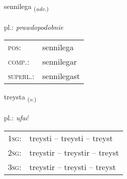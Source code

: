 \documentclass[frontgrid, backgrid]{flacards}\usepackage[]{graphicx}\usepackage[]{xcolor}
\begin{document}
\renewcommand{\flhead}{\vskip5pt \fboxsep=0pt {\small\bfseries\footnotesize Atviksorð | Adverb}}
\renewcommand{\fcfoot}{\vskip5pt \fboxsep=0pt \hspace{2pt}{\small\bfseries\footnotesize 1K}}

\renewcommand{\blhead}{\vskip5pt {\small\bfseries\footnotesize Atviksorð | Adverb }}
\renewcommand{\bcfoot}{\vskip5pt \hspace{2pt}{\small\bfseries\footnotesize 1K}}


{sennilega \small{\textsubscript{(\textit{adv.})}} \\[1ex] %
\textphonetic{[sɛnɪlɛɣa]} \\
pl.: \emph{prawdopodobnie} \\  [2ex]
\renewcommand*{\arraystretch}{0.8}
\begin{tabular}{ll}
\textsc{pos}: & sennilega \\ 
\textsc{comp.}: & sennilegar \\ 
\textsc{superl.}: & sennilegast \\
\end{tabular}
}

\renewcommand{\flhead}{\vskip5pt \fboxsep=0pt {\small\bfseries\footnotesize Sagnorð | Verb}}
\renewcommand{\fcfoot}{\vskip5pt \fboxsep=0pt \hspace{2pt}{\small\bfseries\footnotesize 1K}}

\renewcommand{\blhead}{\vskip5pt {\small\bfseries\footnotesize Sagnorð | Verb }}
\renewcommand{\bcfoot}{\vskip5pt \hspace{2pt}{\small\bfseries\footnotesize 1K}}


{treysta \small{\textsubscript{(\textit{v.})}} \\[1ex] %
\textphonetic{[tʰreista]} \\
pl.: \emph{ufać} \\  [2ex]
\renewcommand*{\arraystretch}{0.8}
\begin{tabular}{p{1cm}l}
\textsc{1sg}: & treysti -- treysti -- treyst \\ 
\textsc{2sg}: & treystir -- treystir -- treyst \\ 
\textsc{3sg}: & treystir -- treysti -- treyst \\ 
\end{tabular}
}
\end{document}
